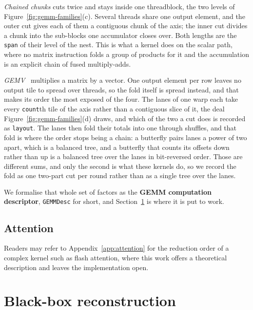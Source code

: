 \documentclass[sigplan,nonacm]{acmart}
\begin{document}
\begin{sloppypar}
\textit{Chained chunks} cuts twice and stays inside one threadblock, the two
levels of Figure~\ref{fig:gemm-families}(c). Several
threads share one output element, and the outer cut gives each of them a
contiguous chunk of the axis; the inner cut divides a chunk into the sub-blocks
one accumulator closes over. Both lengths are the \texttt{span} of their level of
the nest. This is what a kernel does on the scalar path, where no matrix
instruction folds a group of products for it and the accumulation is an explicit
chain of fused multiply-adds.



\textit{GEMV}~\cite{blas2_1988} multiplies a matrix by a vector. One output
element per row leaves no output tile to spread over threads, so the fold itself
is spread instead, and that makes its order the most exposed of the four. The
lanes of one warp each take every \texttt{count}th tile of the axis rather than a
contiguous slice of it, the deal Figure~\ref{fig:gemm-families}(d) draws, and which of the two a cut does is recorded as
\texttt{layout}. The lanes then fold their totals into one through shuffles, and
that fold is where the order stops being a chain: a butterfly pairs lanes a
power of two apart, which is a balanced tree, and a butterfly that counts its
offsets down rather than up is a balanced tree over the lanes in bit-reversed
order. Those are different sums, and only the second is what these kernels do, so
we record the fold as one two-part cut per round rather than as a single tree
over the lanes.

 We formalise that whole set of factors as the \textbf{GEMM computation descriptor},
\texttt{GEMMDesc} for short, and Section~\ref{sec:reconstruction} is where it is
put to work.
\end{sloppypar}



\subsection{Attention}
\label{sec:theory-attention}

Readers may refer to Appendix~\ref{app:attention} for the reduction order of a
complex kernel such as flash attention, where this work offers a theoretical
description and leaves the implementation open.

\section{Black-box reconstruction}
\label{sec:reconstruction}
\end{document}
